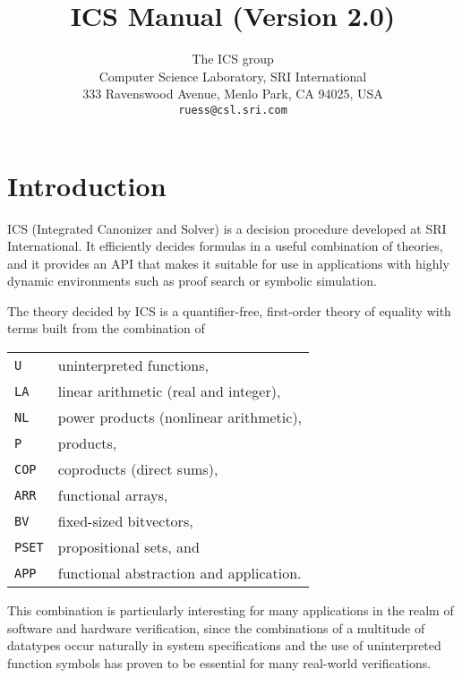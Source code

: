 \documentclass[12pt]{article}
\title{ICS Manual (Version 2.0)}
\author{The ICS group\\[0.3em]
  {\small Computer Science Laboratory, SRI International} \\[-0.2em]
  {\small 333 Ravenswood Avenue, Menlo Park, CA 94025, USA} \\[-0.2em]
  {\small\texttt{ruess@csl.sri.com}}}
\date{}
\begin{document}
\maketitle
\tableofcontents

\section{Introduction}\label{sec:intro}

ICS (Integrated Canonizer and Solver) is a
decision procedure developed at SRI International.
It efficiently decides formulas in a useful combination
of theories, and it provides an API that makes
it suitable for use in applications with highly dynamic
environments such as proof search or symbolic simulation.

The theory decided by ICS is a quantifier-free,
first-order theory of equality with terms built from
the combination of\\

  \begin{tabular}{ll}
  \texttt{U} & uninterpreted functions, \\
  \texttt{LA} & linear arithmetic (real and integer),\\
  \texttt{NL} & power products (nonlinear arithmetic),\\
  \texttt{P} & products,\\
  \texttt{COP} & coproducts (direct sums),\\
  \texttt{ARR} & functional arrays,\\
  \texttt{BV} & fixed-sized bitvectors,\\
  \texttt{PSET} & propositional sets, and\\
  \texttt{APP} & functional abstraction and application.\\
  \end{tabular}

\noindent
This combination is particularly interesting for many applications in the 
realm of software and hardware verification, since the combinations of a 
multitude of datatypes occur naturally in system specifications and the 
use of uninterpreted function symbols has proven to be essential
for many real-world verifications.
\end{document}
